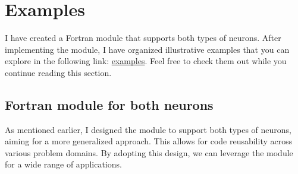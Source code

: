 \section{Examples}
I have created a Fortran module that supports both types of neurons. After implementing the module,
I have organized illustrative examples that you can explore in the following link:
\href{https://github.com/alecksandr26/fortran-ml/tree/main/examples}{examples}.
Feel free to check
them out while you continue reading this section.
\subsection{Fortran module for both neurons}
As mentioned earlier, I designed the module to support both types of neurons, aiming for a more generalized
approach. This allows for code reusability across various problem domains. By adopting this design, we can
leverage the module for a wide range of applications.

\begin{lstlisting}

\end{lstlisting}




